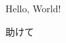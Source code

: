 \documentclass{ltjarticle}
\begin{document}
Hello, World! \cite{vaswani2017attention}

助けて

% 
% 
\end{document}
